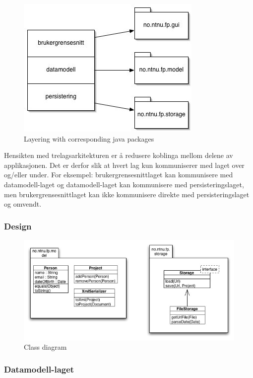 \begin{figure}[H]
    \centering
    \includegraphics[scale=0.8]{resources/layering-corresponding-java-packets.jpg}
    \caption{Layering with corresponding java packages}
    \label{fig:layering-corresponding-java-packets}
\end{figure}

Hensikten med trelagsarkitekturen er å redusere koblinga mellom delene av applikasjonen. Det er derfor slik at hvert lag kun kommuniserer med laget over og/eller under. For eksempel: brukergrensesnittlaget kan kommunisere med datamodell-laget og datamodell-laget kan kommunisere med persisteringslaget, men brukergrensesnittlaget kan ikke kommunisere direkte med persisteringslaget og omvendt.

\subsubsection{Design}

\begin{figure}[H]
    \centering
    \includegraphics[width=\textwidth]{resources/design-classdiagram.jpg}
    \caption{Class diagram}
    \label{fig:classdiagram}
\end{figure}

\subsubsection{Datamodell-laget}


